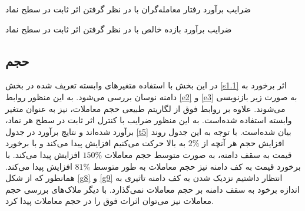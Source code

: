 \documentclass[12pt]{article}
\begin{document}

\begin{table}[htbp]
\centering
\begin{LTR}
\lr{\resizebox{\textwidth}{!}{

}
}
\end{LTR}
\caption{ضرایب برآورد رفتار معامله‌گران با در نظر گرفتن اثر ثابت در سطح نماد}
\label{t3}
\end{table}

\begin{table}[htbp]
\centering
\begin{LTR}
\lr{}
\end{LTR}
\caption{ضرایب برآورد بازده خالص با در نظر گرفتن اثر ثابت در سطح نماد}
\label{t11}
\end{table}

\restoregeometry






\subsection{حجم}

در این بخش با استفاده متغیر‌های وابسته تعریف شده در بخش 
\ref{s1.1}
اثر برخورد به دامنه نوسان بررسی می‌شود. به این منظور روابط 
\ref{e2} 
و
\ref{e3}
به صورت زیر بازنویسی می‌شوند. 
 علاوه بر روابط فوق از لگاریتم طبیعی حجم معاملات، نیز به عنوان متغیر وابسته استفاده شده‌است. به این منظور ضرایب با کنترل اثر ثابت در سطح هر نماد، برآورد شده‌اند و نتایج برآورد در جدول 
 \ref{t5}
 بیان شده‌است. با توجه به این جدول  روند افزایش حجم هر آنچه از 
$  2 \% $
 به بالا حرکت می‌کنیم افزایش پیدا می‌کند و با 
 برخورد قیمت به سقف دامنه، به صورت متوسط حجم معاملات
  $ 150\% $
  افزایش پیدا می‌کند. 
 با برخورد قیمت به کف دامنه نیز حجم معاملات به طور متوسط 
  $ 81\% $
  افزایش پیدا می‌کند. همانطور که از شکل 
  \ref{g8}
  و
  \ref{g9}
  انتظار داشتیم نزدیک شدن به کف دامنه تاثیری به اندازه برخود به سقف دامنه بر حجم معاملات نمی‌گذارد.
  با دیگر ملاک‌های بررسی حجم معاملات نیز می‌توان اثرات فوق را در حجم معاملات پیدا کرد.
 
\end{document}
